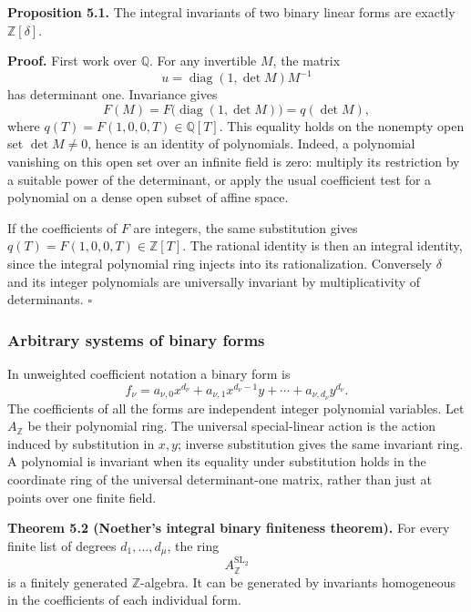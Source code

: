 \documentclass[
]{article}
\begin{document}
\protect{}\label{proposition-5-1}{}

\textbf{Proposition 5.1.} The integral invariants of two binary linear
forms are exactly \(\mathbb Z [\delta]\).

\textbf{Proof.} First work over \(\mathbb Q\). For any invertible \(M\),
the matrix \[
u=\operatorname{diag}(1,\det M)M^{-1}
\] has determinant one. Invariance gives \[
F(M)=F\bigl(\operatorname{diag}(1,\det M)\bigr)=q(\det M),
\] where \(q(T)=F(1,0,0,T)\in\mathbb Q [T]\). This equality holds on the
nonempty open set \(\det M\ne0\), hence is an identity of polynomials.
Indeed, a polynomial vanishing on this open set over an infinite field
is zero: multiply its restriction by a suitable power of the
determinant, or apply the usual coefficient test for a polynomial on a
dense open subset of affine space.

If the coefficients of \(F\) are integers, the same substitution gives
\(q(T)=F(1,0,0,T)\in\mathbb Z [T]\). The rational identity is then an
integral identity, since the integral polynomial ring injects into its
rationalization. Conversely \(\delta\) and its integer polynomials are
universally invariant by multiplicativity of determinants. \(\square\)

\subsubsection{Arbitrary systems of binary
forms}\label{arbitrary-systems-of-binary-forms}

In unweighted coefficient notation a binary form is \[
f_\nu=a_{\nu,0}x^{d_\nu}
+a_{\nu,1}x^{d_\nu-1}y+\cdots+a_{\nu,d_\nu}y^{d_\nu}.
\] The coefficients of all the forms are independent integer polynomial
variables. Let \(A_{\mathbb Z}\) be their polynomial ring. The universal
special-linear action is the action induced by substitution in \(x,y\);
inverse substitution gives the same invariant ring. A polynomial is
invariant when its equality under substitution holds in the coordinate
ring of the universal determinant-one matrix, rather than just at points
over one finite field.

\protect{}\label{theorem-5-2}{}

\textbf{Theorem 5.2 (Noether's integral binary finiteness theorem).} For
every finite list of degrees \(d_1,\ldots,d_\mu\), the ring \[
A_{\mathbb Z}^{\operatorname{SL}_2}
\] is a finitely generated \(\mathbb Z\)-algebra. It can be generated by
invariants homogeneous in the coefficients of each individual form.
\end{document}

